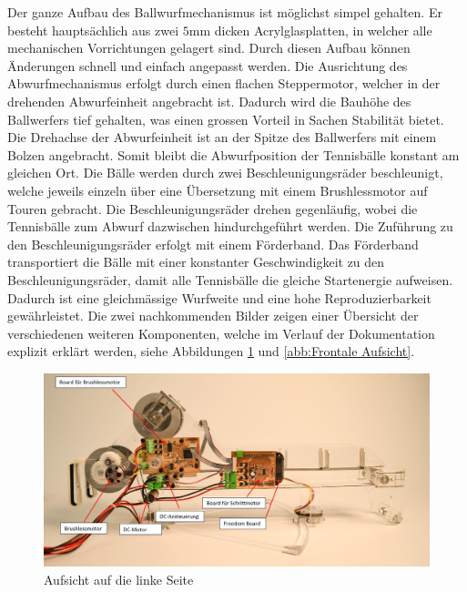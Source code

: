    Der ganze Aufbau des Ballwurfmechanismus ist möglichst simpel gehalten. Er besteht 
    hauptsächlich aus zwei $5\si{\milli\meter}$ dicken Acrylglasplatten, in welcher alle mechanischen 
    Vorrichtungen gelagert sind. Durch diesen Aufbau können Änderungen schnell und 
    einfach angepasst werden. Die Ausrichtung des Abwurfmechanismus erfolgt durch 
    einen flachen Steppermotor, welcher in der drehenden Abwurfeinheit angebracht 
    ist. Dadurch wird die Bauhöhe des Ballwerfers tief gehalten, was einen grossen 
    Vorteil in Sachen Stabilität bietet. Die Drehachse der Abwurfeinheit ist an der Spitze des 
    Ballwerfers mit einem Bolzen angebracht. Somit bleibt die Abwurfposition der 
    Tennisbälle konstant am gleichen Ort. Die Bälle werden durch zwei 
    Beschleunigungsräder beschleunigt, welche jeweils einzeln 
    über eine Übersetzung mit einem Brushlessmotor auf Touren gebracht. Die Beschleunigungsräder 
    drehen gegenläufig, wobei die Tennisbälle zum Abwurf dazwischen hindurchgeführt werden. Die Zuführung zu den Beschleunigungsräder erfolgt mit 
    einem Förderband. Das Förderband transportiert die Bälle mit einer 
    konstanter Geschwindigkeit zu den Beschleunigungsräder, damit alle Tennisbälle die 
    gleiche Startenergie aufweisen. Dadurch ist eine gleichmässige Wurfweite und eine 
    hohe Reproduzierbarkeit gewährleistet.
    Die zwei nachkommenden Bilder zeigen einer Übersicht der verschiedenen weiteren Komponenten, welche im Verlauf der Dokumentation explizit erklärt werden, siehe Abbildungen \ref{abb:Aufsicht auf die linke Seite} und \ref{abb:Frontale Aufsicht}.
	
	\begin{figure}[h!]
	   	\includegraphics[width=1\textwidth,clip,trim=8mm 0mm 15mm 0mm]
	   	{Enddokumentation/Bilder/Geraeteuebersicht_1.jpg}
	   	\centering
	   	\caption{Aufsicht auf die linke Seite}
	   	\label{abb:Aufsicht auf die linke Seite}
	\end{figure}
	
